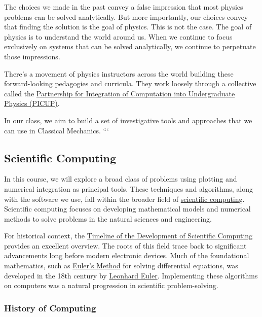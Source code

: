 \documentclass[11pt]{article}
\begin{document}
The choices we made in the past convey a false impression that most
physics problems can be solved analytically. But more importantly, our
choices convey that finding the solution is the goal of physics. This is
not the case. The goal of physics is to understand the world around us.
When we continue to focus exclusively on systems that can be solved
analytically, we continue to perpetuate those impressions.

There's a movement of physics instructors across the world building
these forward-looking pedagogies and curricula. They work loosely
through a collective called the
\href{https://www.compadre.org/PICUP/}{Partnership for Integration of
Computation into Undergraduate Physics (PICUP)}.

In our class, we aim to build a set of investigative tools and
approaches that we can use in Classical Mechanics. ```

    \subsection{Scientific Computing}\label{scientific-computing}

In this course, we will explore a broad class of problems using plotting
and numerical integration as principal tools. These techniques and
algorithms, along with the software we use, fall within the broader
field of
\href{https://en.wikipedia.org/wiki/Scientific_computing}{scientific
computing}. Scientific computing focuses on developing mathematical
models and numerical methods to solve problems in the natural sciences
and engineering.

For historical context, the
\href{https://en.wikipedia.org/wiki/Timeline_of_scientific_computing}{Timeline
of the Development of Scientific Computing} provides an excellent
overview. The roots of this field trace back to significant advancements
long before modern electronic devices. Much of the foundational
mathematics, such as
\href{https://en.wikipedia.org/wiki/Euler_method}{Euler's Method} for
solving differential equations, was developed in the 18th century by
\href{https://en.wikipedia.org/wiki/Leonhard_Euler}{Leonhard Euler}.
Implementing these algorithms on computers was a natural progression in
scientific problem-solving.

\subsubsection{History of Computing}\label{history-of-computing}
\end{document}
